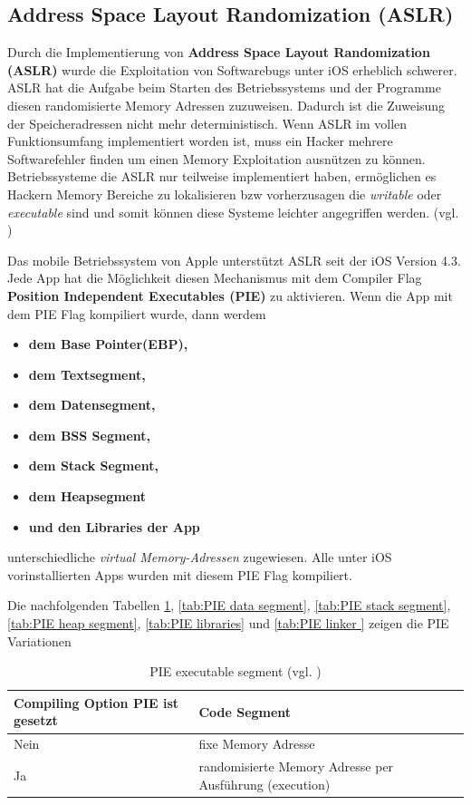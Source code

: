 \subsection{Address Space Layout Randomization (ASLR)}
\label{sec:ASLR}

Durch die Implementierung von \textbf{Address Space Layout Randomization (ASLR)} wurde die Exploitation von Softwarebugs unter iOS erheblich schwerer. ASLR hat die Aufgabe beim Starten des Betriebssystems und der Programme diesen randomisierte Memory Adressen zuzuweisen. Dadurch ist die Zuweisung der Speicheradressen nicht mehr deterministisch. Wenn ASLR im vollen Funktionsumfang implementiert worden ist, muss ein Hacker mehrere Softwarefehler finden um einen Memory Exploitation ausnützen zu können. Betriebssysteme die ASLR nur teilweise implementiert haben, ermöglichen es Hackern Memory Bereiche zu lokalisieren bzw vorherzusagen die \textit{\glqq writable\grqq{}} oder \textit{\glqq executable\grqq{}} sind und somit können diese Systeme leichter angegriffen werden. (vgl. \cite{Apple[4], ASLR[1]}) \par

Das mobile Betriebssystem von Apple unterstützt ASLR seit der iOS Version 4.3. Jede App hat die Möglichkeit diesen Mechanismus mit dem Compiler Flag \textbf{Position Independent Executables (PIE)} zu aktivieren. Wenn die App mit dem PIE Flag kompiliert wurde, dann werdem
\begin{itemize}
    \item \textbf{dem Base Pointer(EBP),}
    \item \textbf{dem Textsegment,} 
    \item \textbf{dem Datensegment,}
    \item \textbf{dem BSS Segment,} 
    \item \textbf{dem Stack Segment,}
    \item \textbf{dem Heapsegment}
    \item \textbf{und den Libraries der App}
\end{itemize}
unterschiedliche \textit{\glqq virtual Memory-Adressen\grqq{}} zugewiesen. Alle unter iOS vorinstallierten Apps wurden mit diesem PIE Flag kompiliert. 

Die nachfolgenden Tabellen \ref{tab:PIE executable segment}, \ref{tab:PIE data segment}, \ref{tab:PIE stack segment}, \ref{tab:PIE heap segment}, \ref{tab:PIE libraries} und \ref{tab:PIE linker } zeigen die PIE Variationen

 \begin{table}
    \begin{center}
         \begin{tabular}{|p{6cm}|p{9cm}|} \hline
            Compiling Option PIE ist gesetzt & Code Segment \\ \hline
            Nein & fixe Memory Adresse\\ \hline
            Ja & randomisierte Memory Adresse per Ausführung (execution)\\ \hline
        \end{tabular}
        \caption{PIE executable segment (vgl. \cite{iOSSec[5]}) }
       \label{tab:PIE executable segment}
    \end{center}
\end{table}

